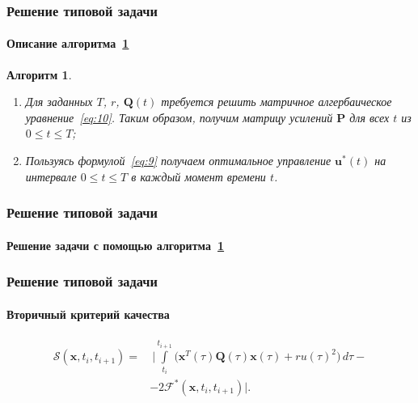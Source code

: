 \documentclass[ignorenonframetext,hyperref={pdftex,unicode,pdfpagelabels=false},compress]{beamer}
\newtheorem{alg}{Алгоритм}
\begin{document}
\begin{frame}
	\frametitle{Решение типовой задачи}
	\framesubtitle{Описание алгоритма~\ref{alg:2}}
    
    \begin{alg}\label{alg:2}~
        \begin{enumerate}
            \item
                Для заданных $T$, $r$, $\mathbf{Q}(t)$ требуется решить матричное алгербаическое уравнение~\ref{eq:10}. Таким образом, получим матрицу усилений $\mathbf{P}$ для всех $t$ из $0 \leqslant t \leqslant T$;

            \item
                Пользуясь формулой~\ref{eq:9} получаем оптимальное управление $\mathbf{u}^*(t)$ на интервале $0 \leqslant t \leqslant T$ в каждый момент времени $t$.
        \end{enumerate}
    \end{alg}
\end{frame}



\begin{frame}
	\frametitle{Решение типовой задачи}
	\framesubtitle{Решение задачи с помощью алгоритма~\ref{alg:2}}
    
    \begin{figure}\center
        
        \label{fig:alg2}
    \end{figure}
\end{frame}



\begin{frame}
	\frametitle{Решение типовой задачи}
	\framesubtitle{Вторичный критерий качества}
    
    \begin{equation}\label{eq:18}
        \begin{split}
            \mathscr{S}(\mathbf{x}, t_i, t_{i+1}) =&~ \Biggl| \int\limits_{t_i}^{t_{i+1}} \bigl( \mathbf{x}^T(\tau)\mathbf{Q}(\tau)\mathbf{x}(\tau) + ru(\tau)^2 \bigr)\,d\tau -\\
            &- 2\mathcal{F}^*(\mathbf{x}, t_i, t_{i+1}) \Biggr| \text{.}
        \end{split}
    \end{equation}
\end{frame}
\end{document}

